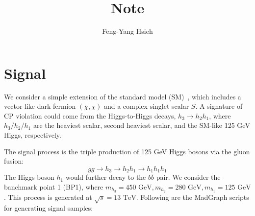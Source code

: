 \documentclass[12pt]{article}
\title{Note}
\author{Feng-Yang Hsieh}
\date{}
\begin{document}
\maketitle


\section{Signal}%
\label{sec:signal}
    We consider a simple extension of the standard model (SM)~\cite{Chen:2022vac}, which includes a vector-like dark fermion $(\overline{\chi}, \chi)$ and a complex singlet scalar $S$. A signature of CP violation could come from the Higgs-to-Higgs decays, $h_3 \to h_2h_1$, where $h_3 / h_2 / h_1$ are the heaviest scalar, second heaviest scalar, and the SM-like 125 GeV Higgs, respectively.

    The signal process is the triple production of 125 GeV Higgs bosons via the gluon fusion:
    \[
        g g \to h_3 \to h_2 h_1 \to h_1h_1h_1
    \]
    The Higgs boson $h_1$ would further decay to the $b \overline{b}$ pair. We consider the banchmark point 1 (BP1), where $m_{h_3} = \text{450 GeV}, m_{h_2} = \text{280 GeV}, m_{h_1} = \text{125 GeV}$. This process is generated at $\sqrt{s} = \text{13 TeV}$. Following are the MadGraph scripts for generating signal samples:
\end{document}
